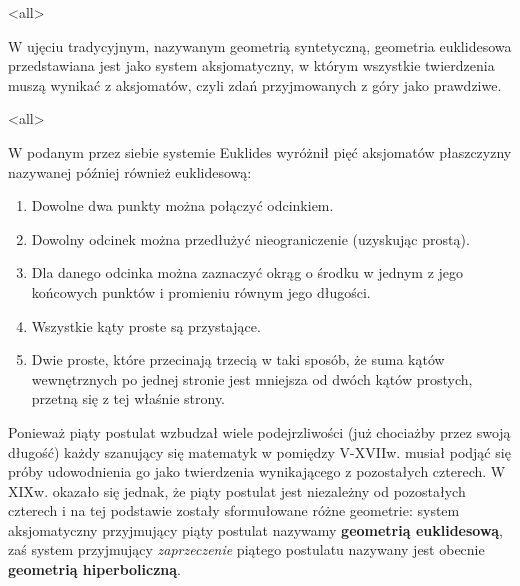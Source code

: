  \mode*
\mode<all>{}
\begin{frame}[<+->]
W ujęciu tradycyjnym, nazywanym geometrią syntetyczną, geometria euklidesowa przedstawiana jest jako system aksjomatyczny, w którym wszystkie twierdzenia muszą wynikać z aksjomatów, czyli zdań przyjmowanych z góry jako prawdziwe.
\end{frame}

\mode<all>{}
\begin{frame}[<+->]

W podanym przez siebie systemie Euklides wyróżnił pięć aksjomatów płaszczyzny nazywanej później również euklidesową:
\begin{enumerate}
\item Dowolne dwa punkty można połączyć odcinkiem.
\item Dowolny odcinek można przedłużyć nieograniczenie (uzyskując prostą).
\item Dla danego odcinka można zaznaczyć okrąg o środku w jednym z jego końcowych punktów i promieniu równym jego długości.
\item Wszystkie kąty proste są przystające.
\item Dwie proste, które przecinają trzecią w taki sposób, że suma kątów wewnętrznych po jednej stronie jest mniejsza od dwóch kątów prostych, przetną się z tej właśnie strony.
\end{enumerate}
\end{frame}

Ponieważ piąty postulat wzbudzał wiele podejrzliwości (już chociażby przez swoją długość) każdy szanujący się matematyk w pomiędzy V-XVIIw. musiał podjąć się próby udowodnienia go jako twierdzenia wynikającego z pozostałych czterech. W XIXw. okazało się jednak, że piąty postulat jest niezależny od pozostałych czterech i na tej podstawie zostały sformułowane różne geometrie: system aksjomatyczny przyjmujący piąty postulat nazywamy \textbf{geometrią euklidesową}, zaś system przyjmujący \textit{zaprzeczenie} piątego postulatu nazywany jest obecnie \textbf{geometrią hiperboliczną}.


